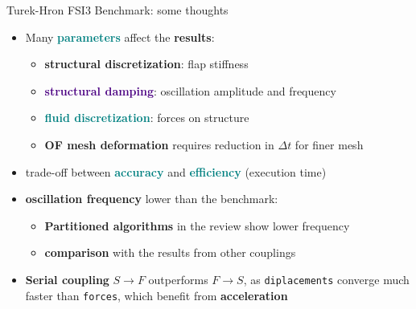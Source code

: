 \documentclass[10pt,t]{beamer}
\begin{document}
\begin{frame}{Turek-Hron FSI3 Benchmark: some thoughts}
    
    \begin{itemize}
        \item Many \textcolor{teal}{\textbf{parameters}} affect the \textbf{results}:
        
        \vspace{2mm}
        
        \begin{itemize}
            \item \textcolor{dorange}{\textbf{structural discretization}}: flap stiffness
            \item \textcolor{indigo}{\textbf{structural damping}}: oscillation amplitude and frequency
            \item \textcolor{teal}{\textbf{fluid discretization}}: forces on structure
            \item \textcolor{dblue}{\textbf{OF mesh deformation}} requires reduction in $\Delta t$ for finer mesh
        \end{itemize}
        
        \vspace{3mm}
        
        \pause
        
        \item trade-off between \textcolor{teal}{\textbf{accuracy}} and \textcolor{teal}{\textbf{efficiency}} (execution time)
        
        \vspace{3mm}
        
        \pause
        
        \item \textcolor{fgreen}{\textbf{oscillation frequency}} lower than the benchmark:
        
        \vspace{2mm}
        
        \begin{itemize}
            \item \textbf{Partitioned algorithms} in the review show lower frequency
            \item \textbf{comparison} with the results from other couplings
        \end{itemize}
        
        \vspace{3mm}
        
        \pause
        
        \item \textbf{Serial coupling} $S \to F$ outperforms $F \to S$, as \texttt{diplacements} converge much faster than \texttt{forces}, which benefit from \textbf{acceleration}
        
    \end{itemize}
    
    
\end{frame}
\end{document}
